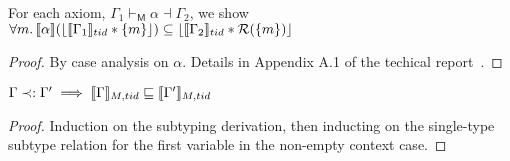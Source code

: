 \begin{lemma}
  \label{lem:axmsoundness}
For each axiom, $\Gamma_{1} \vdash_{\textsf{M}} \alpha \dashv \Gamma_{2}$, we show
$
\forall m\ldotp   \llbracket \alpha \rrbracket  (\lfloor \llbracket \Gamma_{1} \rrbracket_{tid}  * \{m\} \rfloor )\subseteq  \lfloor \llbracket \Gamma_{2} \rrbracket_{tid} * \mathcal{R}(\{m\}) \rfloor
$
\end{lemma}
\begin{proof}
By case analysis on $\alpha$. Details in Appendix A.1 of the techical report~\cite{isotek}. %
\end{proof}
\begin{lemma}\label{lem:cntxsubt-mcln}
$ \Gamma \prec: \Gamma'  \implies \llbracket \Gamma \rrbracket_{M,tid} \sqsubseteq \llbracket  \Gamma' \rrbracket_{M,tid} $
\end{lemma}
\begin{proof}
Induction on the subtyping derivation, then inducting on the single-type subtype relation for the first variable in the non-empty context case.
\end{proof}

